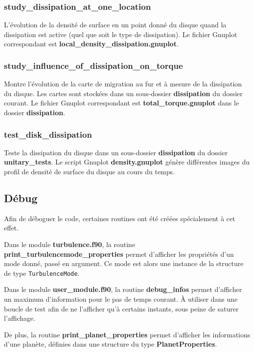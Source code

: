 \subsubsection{study\_dissipation\_at\_one\_location}
L'évolution de la densité de surface en un point donné du disque quand la dissipation est active (quel que soit le type de dissipation). Le fichier Gnuplot correspondant est \textbf{local\_density\_dissipation.gnuplot}. 

\subsubsection{study\_influence\_of\_dissipation\_on\_torque}
Montre l'évolution de la carte de migration au fur et à mesure de la dissipation du disque. Les cartes sont stockées dans un sous-dossier \textbf{dissipation} du dossier courant. Le fichier Gnuplot correspondant est \textbf{total\_torque.gnuplot} dans le dossier \textbf{dissipation}. 


\subsubsection{test\_disk\_dissipation}
Teste la dissipation du disque dans un sous-dossier \textbf{dissipation} du dossier \textbf{unitary\_tests}. Le script Gnuplot \textbf{density.gnuplot} génère différentes images du profil de densité de surface du disque au cours du temps.


\subsection{Débug}
Afin de déboguer le code, certaines routines ont été créées spécialement à cet effet. 

Dans le module \textbf{turbulence.f90}, la routine \textbf{print\_turbulencemode\_properties} permet d'afficher les propriétés d'un mode donné, passé en argument. Ce mode est alors une instance de la structure de type \texttt{TurbulenceMode}. 

Dans le module \textbf{user\_module.f90}, la routine \textbf{debug\_infos} permet d'afficher un maximum d'information pour le pas de temps courant. À utiliser dans une boucle de test afin de ne l'afficher qu'à certains instants, sous peine de saturer l'affichage. 

De plus, la routine \textbf{print\_planet\_properties} permet d'afficher les informations d'une planète, définies dans une structure du type \textbf{PlanetProperties}.

